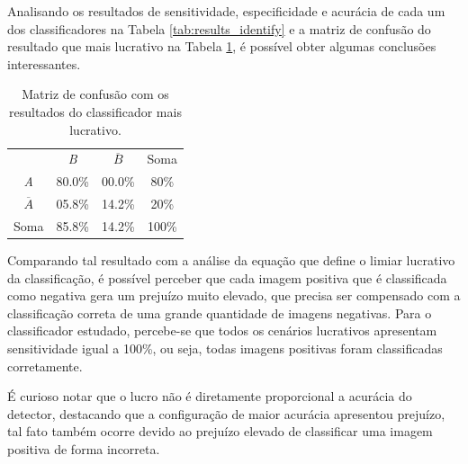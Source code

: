 Analisando os resultados de sensitividade, especificidade e acurácia de cada um dos classificadores na Tabela \ref{tab:results_identify} e a matriz de confusão do resultado que mais lucrativo na Tabela \ref{tab:matriz_de_confusao_best_result}, é possível obter algumas conclusões interessantes.

 \begin{table}[htbp]
     \caption{Matriz de confusão com os resultados do classificador mais lucrativo.}
     \label{tab:matriz_de_confusao_best_result}
     \centering
     \begin{tabular}{cccc}\hline\hline
         & \textit{B} & $\overline{B}$ & Soma\\
     \textit{A} & 80.0\% & 00.0\% & 80\% \\
     $\overline{A}$ & 05.8\% & 14.2\% & 20\% \\
     Soma & 85.8\% & 14.2\% & 100\% \\
     \hline\hline
     \end{tabular}
 \end{table}

Comparando tal resultado com a análise da equação que define o limiar lucrativo da classificação, é possível perceber que cada imagem positiva que é classificada como negativa gera um prejuízo muito elevado, que precisa ser compensado com a classificação correta de uma grande quantidade de imagens negativas. Para o classificador estudado, percebe-se que todos os cenários lucrativos apresentam sensitividade igual a 100\%, ou seja, todas imagens positivas foram classificadas corretamente.

É curioso notar que o lucro não é diretamente proporcional a acurácia do detector, destacando que a configuração de maior acurácia apresentou prejuízo, tal fato também ocorre devido ao prejuízo elevado de classificar uma imagem positiva de forma incorreta.